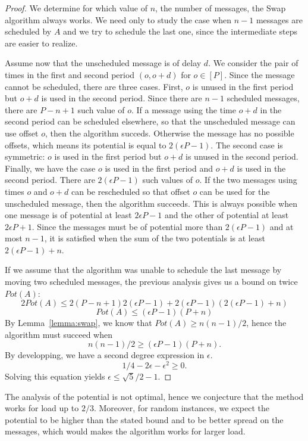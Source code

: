 \documentclass[10pt, conference, letterpaper]{IEEEtran}
\begin{document}
\begin{proof}
We determine for which value of $n$, the number of messages, the Swap algorithm
always works. We need only to study the case when $n-1$ messages are scheduled by $A$
and we try to schedule the last one, since the intermediate steps are easier to realize. 

Assume now that the unscheduled message is of delay $d$. We consider the pair 
of times in the first and second period $(o,o+d)$ for $o \in [P]$. Since the message
cannot be scheduled, there are three cases. First, $o$ is unused in the first period but $o+d$ is used in the second period. Since there are $n-1$ scheduled messages, there are $P-n+1$ such value of $o$. If a message using the time $o+d$ in the second period can be scheduled elsewhere, so that the unscheduled message can use offset $o$, then the algorithm succeds.
Otherwise the message has no possible offsets, which means its potential is equal to $2(\epsilon P -1)$.
The second case is symmetric: $o$ is used in the first period but $o+d$ is unused in the second period. 
Finally, we have the case $o$ is used in the first period and $o+d$ is used in the second period.  There are $2(\epsilon P -1)$ such values of $o$. If the two messages using times 
$o$ and $o+d$ can be rescheduled so that offset $o$ can be used for the unscheduled message,
then the algorithm succeeds. This is always possible when one message is of potential at least $2\epsilon P -1$ and the other of potential at least $2\epsilon P + 1$. Since the messages must be of potential more than $2(\epsilon P -1)$ and at most $n-1$, it is satisfied when the sum of the two potentials is at least $2(\epsilon P -1) + n$.

If we assume that the algorithm was unable to schedule the last message by moving two scheduled messages, the previous analysis gives us a bound on twice $Pot(A)$: 
$$ 2Pot(A) \leq 2(P-n+1) 2(\epsilon P -1) + 2(\epsilon P -1)(2(\epsilon P -1) + n) $$
$$ Pot(A) \leq (\epsilon P -1) (P + n)$$
By Lemma~\ref{lemma:swap}, we know that $Pot(A) \geq n(n-1)/2$, hence 
the algorithm must succeed when
$$n(n-1)/2 \geq  (\epsilon P -1) (P + n).$$
By developping, we have a second degree expression in $\epsilon$.
$$1/4 - 2\epsilon - \epsilon ^2 \geq  0.$$
Solving this equation yields $\epsilon \leq \sqrt{5}/2 -1$.
\end{proof}

The analysis of the potential is not optimal, hence we conjecture that the method works
for load up to $2/3$. Moreover, for random instances, we expect the potential to be higher 
than the stated bound and to be better spread on the messages, which would makes the algorithm
works for larger load.
\end{document}
